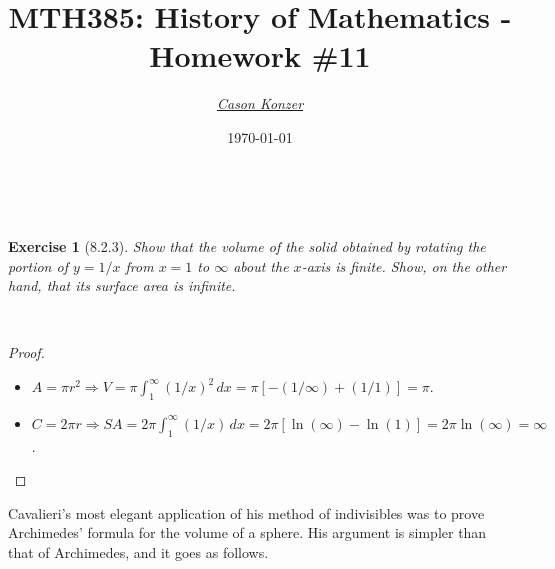 \documentclass[12pt]{article}
\newcommand{\XB}{\color{black}}
\newcommand{\XBB}{\color{blue}}
\newcommand{\XV}{\color{violet}}
\newcommand{\ds}{\displaystyle}
\theoremstyle{plain}
\newtheorem{ex}{Exercise}
\begin{document}
\title{\textbf{MTH385}: History of Mathematics - Homework \#11}
\date{\today}
\author{\XV\textit{\large{\href{https://github.com/casonk}{Cason Konzer}}}\XB}

\maketitle

\hrulefill

\newpage


\XBB\hrulefill\XB \\
\begin{ex} [8.2.3]
  Show that the volume of the solid obtained by rotating the portion of $ y = 1/x $ from $ x = 1 $ to $ \infty $ about the $ x $-axis is finite. 
  Show, on the other hand, that its surface area is infinite.
\end{ex}
\XBB\hrulefill\XB \\

\begin{proof}
  \ \\

  \begin{itemize}
    \item $ \ds A = \pi r^{2} \Rightarrow V = \pi \int_{1}^{\infty} (1/x)^{2} \,dx = \pi[-(1/\infty) + (1/1) ]  = \pi  $.
    \item $ \ds C = 2 \pi r \Rightarrow SA = 2 \pi \int_{1}^{\infty} (1/x) \,dx = 2\pi[\ln(\infty) - \ln(1)] = 2\pi\ln(\infty) = \infty $.
  \end{itemize}

\end{proof}

\newpage

Cavalieri's most elegant application of his method of indivisibles was to prove Archimedes' formula for the volume of a sphere. 
His argument is simpler than that of Archimedes, and it goes as follows.

\end{document}
